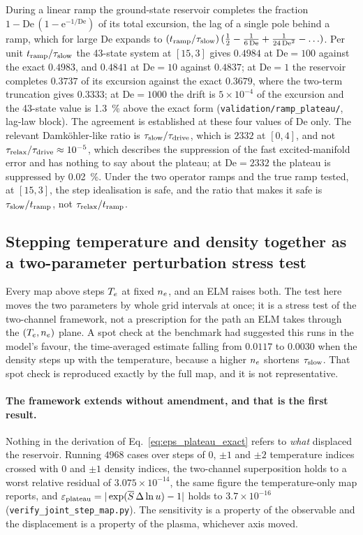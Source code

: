During a linear ramp the ground-state reservoir completes the fraction
$1 - \mathrm{De}\,(1-\mathrm{e}^{-1/\mathrm{De}})$ of its total excursion, the
lag of a single pole behind a ramp, which for large $\mathrm{De}$ expands to
$(t_{\mathrm{ramp}}/\tau_{\mathrm{slow}})\,(\tfrac12 - \tfrac{1}{6\,\mathrm{De}}
+ \tfrac{1}{24\,\mathrm{De}^{2}} - \ldots)$. Per unit $t_{\mathrm{ramp}}/\tau_{\mathrm{slow}}$
the 43-state system at $[15,3]$ gives $0.4984$ at $\mathrm{De}=100$ against the
exact $0.4983$, and $0.4841$ at $\mathrm{De}=10$ against $0.4837$; at
$\mathrm{De}=1$ the reservoir completes $0.3737$ of its excursion against the
exact $0.3679$, where the two-term truncation gives $0.3333$; at
$\mathrm{De}=1000$ the drift is $5\times10^{-4}$ of the excursion and the
43-state value is \SI{1.3}{\percent} above the exact form
(\texttt{validation/ramp\_plateau/}, lag-law block). The agreement is
established at these four values of $\mathrm{De}$ only. The relevant Damk\"ohler-like ratio is $\tau_{\mathrm{slow}}/\tau_{\mathrm{drive}}$,
which is $2332$ at $[0,4]$, and not $\tau_{\mathrm{relax}}/\tau_{\mathrm{drive}} \approx 10^{-5}$, which
describes the suppression of the fast excited-manifold error and has nothing to
say about the plateau; at $\mathrm{De} = 2332$ the plateau is suppressed by
\SI{0.02}{\percent}. Under the two operator ramps and the true ramp tested, at
$[15,3]$, the step idealisation is safe, and the ratio that makes it safe is
$\tau_{\mathrm{slow}}/t_{\mathrm{ramp}}$, not $\tau_{\mathrm{relax}}/t_{\mathrm{ramp}}$.

\subsection{Stepping temperature and density together as a two-parameter perturbation stress test}
\label{sec:joint_step}

Every map above steps $T_e$ at fixed $n_e$, and an ELM raises both. The test
here moves the two parameters by whole grid intervals at once; it is a stress
test of the two-channel framework, not a prescription for the path an ELM
takes through the $(T_e,n_e)$ plane. A
spot check at the benchmark had suggested this runs in the model's favour, the
time-averaged estimate falling from $0.0117$ to $0.0030$ when the density steps up
with the temperature, because a higher $n_e$ shortens $\tau_{\mathrm{slow}}$. That spot
check is reproduced exactly by the full map, and it is not representative.

\paragraph{The framework extends without amendment, and that is the first
result.} Nothing in the derivation of Eq.~\eqref{eq:eps_plateau_exact} refers to
\emph{what} displaced the reservoir. Running $4968$ cases over steps of $0$,
$\pm1$ and $\pm2$ temperature indices crossed with $0$ and $\pm1$ density
indices, the two-channel superposition holds to a worst relative residual of
$3.075\times10^{-14}$, the same figure the temperature-only map reports, and
$\varepsilon_{\mathrm{plateau}} = |\exp(\overline{S}\,\Delta\ln u)-1|$ holds to
$3.7\times10^{-16}$ (\texttt{verify\_joint\_step\_map.py}). The sensitivity is a
property of the observable and the displacement is a property of the plasma,
whichever axis moved.

